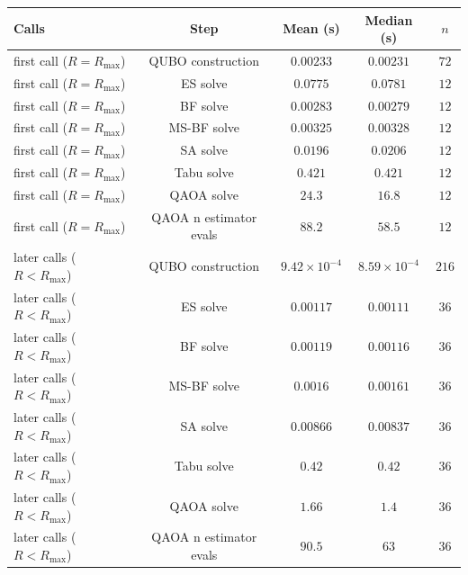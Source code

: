 \begin{longtable}{@{}lcccc@{}}
\toprule
Calls & Step & Mean (s) & Median (s) & \(n\) \\
\midrule
\endhead
first call (\(R=R_{\max}\)) & QUBO construction & \(0.00233\) & \(0.00231\) & \(72\) \\
first call (\(R=R_{\max}\)) & ES solve & \(0.0775\) & \(0.0781\) & \(12\) \\
first call (\(R=R_{\max}\)) & BF solve & \(0.00283\) & \(0.00279\) & \(12\) \\
first call (\(R=R_{\max}\)) & MS-BF solve & \(0.00325\) & \(0.00328\) & \(12\) \\
first call (\(R=R_{\max}\)) & SA solve & \(0.0196\) & \(0.0206\) & \(12\) \\
first call (\(R=R_{\max}\)) & Tabu solve & \(0.421\) & \(0.421\) & \(12\) \\
first call (\(R=R_{\max}\)) & QAOA solve & \(24.3\) & \(16.8\) & \(12\) \\
first call (\(R=R_{\max}\)) & QAOA n estimator evals & \(88.2\) & \(58.5\) & \(12\) \\
later calls (\(R<R_{\max}\)) & QUBO construction & \(9.42{\times}10^{-4}\) & \(8.59{\times}10^{-4}\) & \(216\) \\
later calls (\(R<R_{\max}\)) & ES solve & \(0.00117\) & \(0.00111\) & \(36\) \\
later calls (\(R<R_{\max}\)) & BF solve & \(0.00119\) & \(0.00116\) & \(36\) \\
later calls (\(R<R_{\max}\)) & MS-BF solve & \(0.0016\) & \(0.00161\) & \(36\) \\
later calls (\(R<R_{\max}\)) & SA solve & \(0.00866\) & \(0.00837\) & \(36\) \\
later calls (\(R<R_{\max}\)) & Tabu solve & \(0.42\) & \(0.42\) & \(36\) \\
later calls (\(R<R_{\max}\)) & QAOA solve & \(1.66\) & \(1.4\) & \(36\) \\
later calls (\(R<R_{\max}\)) & QAOA n estimator evals & \(90.5\) & \(63\) & \(36\) \\
\bottomrule
\end{longtable}
